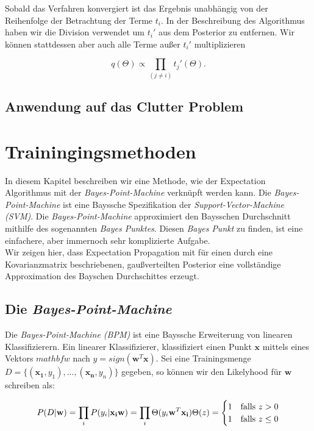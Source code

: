 \documentclass[12pt,a4paper]{scrartcl}
\numberwithin{equation}{section}
\begin{document}
{  Sobald das Verfahren konvergiert ist das Ergebnis unabhängig von der Reihenfolge der Betrachtung der Terme $t_i$.
  In der Beschreibung des Algorithmus haben wir die Division verwendet um $t_i'$ aus dem Posterior zu entfernen. 
  Wir können stattdessen aber auch alle Terme außer $t_i'$ multiplizieren 
  
  \begin{equation}
   q(\Theta) \propto \prod_(j \neq i) t_j'(\Theta).
  \end{equation}
  
  \subsection{Anwendung auf das Clutter Problem}
  
 \section{Trainingingsmethoden}
 
 In diesem Kapitel beschreiben wir eine Methode, wie der Expectation Algorithmus mit der \textit{Bayes-Point-Machine}
 verknüpft werden kann. Die \textit{Bayes-Point-Machine} ist eine Bayssche Spezifikation der \textit{Support-Vector-Machine (SVM)}. 
 Die \textit{Bayes-Point-Machine} approximiert den Baysschen Durchschnitt mithilfe des sogenannten \textit{Bayes Punktes}.
 Diesen \textit{Bayes Punkt} zu finden, ist eine einfachere, aber immernoch sehr komplizierte Aufgabe. 
 \\
 Wir zeigen hier, dass Expectation Propagation mit für einen durch eine Kovarianzmatrix beschriebenen, gaußverteilten
 Posterior eine vollständige Approximation des Bayschen Durchschittes erzeugt. 
 
 \subsection{Die \textit{Bayes-Point-Machine} }
 
 Die \textit{Bayes-Point-Machine (BPM)} ist eine Bayssche Erweiterung von linearen Klassifizierern. 
 Ein linearer Klassifizierer, klassifiziert einen Punkt $\mathbf{x}$ mittels eines Vektors $mathbf{w}$
 nach $y = sign(\mathbf{w}^T \mathbf{x})$. Sei eine Trainingsmenge $D = \{(\mathbf{x_1}, y_1),...,(\mathbf{x_n}, y_n)\}$ gegeben, so 
 können wir den Likelyhood für $\mathbf{w}$ schreiben als: 
 
 \begin{equation}
  P(D|\mathbf{w}) = \prod_i P(y_i| \mathbf{x_i} \mathbf{w}) = \prod_i \Theta(y_i \mathbf{w}^T \mathbf{x_i}) \\
  \Theta(z) = \begin{cases}1&\text{falls }z > 0\\1&\text{falls }z \leq 0\end{cases} 
 \end{equation}
 
}
\end{document}
